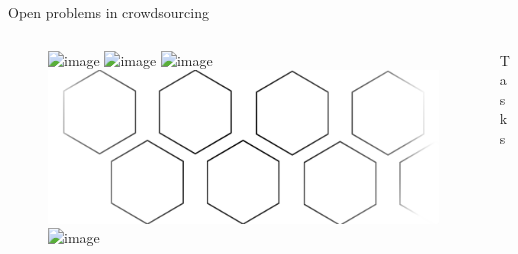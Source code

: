\documentclass[presentation]{subfiles}
\begin{document}
\begin{frame}{Open problems in crowdsourcing}
\begin{columns}
\begin{column}[T]{0.25\textwidth}
\begin{figure}
\begin{overlayarea}{\textwidth}{\textheight}
      \includegraphics<2->[width=.4\textwidth]{figures/complexity/geodesic.png}
      \includegraphics<4->[width=.3\textwidth]{figures/complexity/paper_resized.png}
      \includegraphics<4->[width=.3\textwidth]{figures/complexity/chair_resized.png}
      \vspace{5mm}
      \includegraphics[width=\textwidth]{figures/complexity/hexblend.png}
      \vspace{5mm}
      \includegraphics<3->[width=\textwidth]{figures/complexity/decompose.png}
    \end{overlayarea}
  \end{figure}
\end{column}

\begin{column}[T]{0.25\textwidth}
\centering
\vspace{8mm}



\vspace{7mm}



\small{Tasks}

\vspace{10mm}


\end{column}
\end{columns}
\end{frame}
\end{document}

